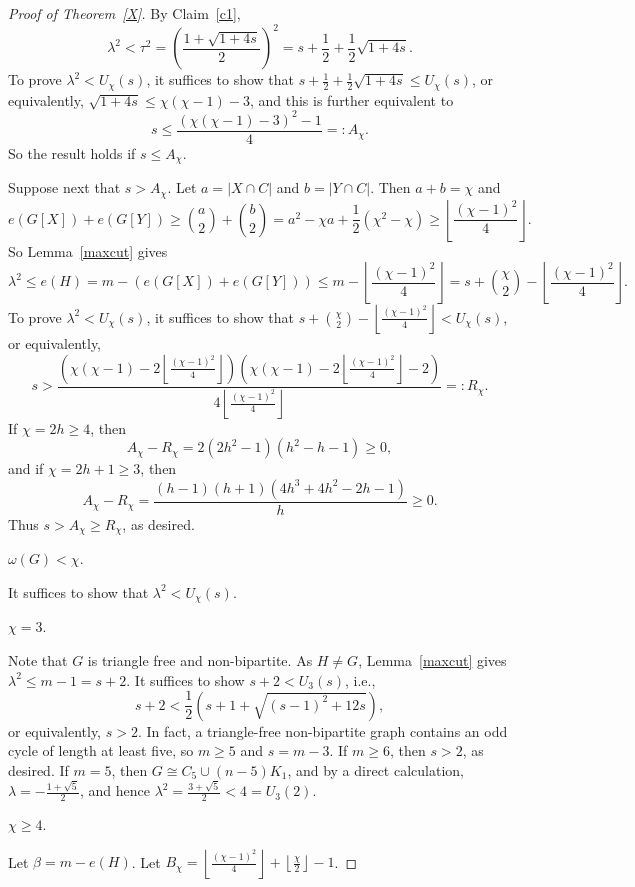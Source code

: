 \documentclass[12pt]{article}
\begin{document}
\begin{proof}[Proof of Theorem~\ref{X}]
By Claim~\ref{c1},
\[
\lambda^2<\tau^2=\left(\frac{1+\sqrt{1+4s}}2\right)^2=s+\frac12+\frac12\sqrt{1+4s}.
\]
To prove $\lambda^2<U_\chi(s)$, it suffices to show that $s+\frac12+\frac12\sqrt{1+4s}\le U_\chi(s)$, or equivalently, %
$\sqrt{1+4s}\le \chi(\chi-1)-3$, and this is further equivalent to \[
s\le\frac{(\chi(\chi-1)-3)^2-1}{4}=:A_\chi.
\]
So the result holds if $s\le A_\chi$. 

Suppose next that $s>A_\chi$.
 Let $a=|X\cap C|$ and $b=|Y\cap C|$. Then $a+b=\chi$ and 
\[
e(G[X])+e(G[Y])\ge {a\choose 2}+{b\choose 2}=a^2-\chi a+\frac{1}{2}(\chi^2-\chi)
\ge \left\lfloor\frac{(\chi-1)^2}{4}\right\rfloor.
\]
So 
Lemma~\ref{maxcut} gives
$$\lambda^2\le e(H)=m-(e(G[X])+e(G[Y]))\le m-\left\lfloor\frac{(\chi-1)^2}{4}\right\rfloor=s+\binom{\chi}{2}-\left\lfloor\frac{(\chi-1)^2}{4}\right\rfloor.$$
To prove $\lambda^2 <U_\chi(s)$, it suffices to show that
 $s+\binom{\chi}{2}-\left\lfloor\frac{(\chi-1)^2}{4}\right\rfloor< U_\chi(s)$, or equivalently, 
\[
s> \frac{\left(\chi(\chi-1)-2\left\lfloor\frac{(\chi-1)^2}{4}\right\rfloor\right)\left(\chi(\chi-1)-2\left\lfloor\frac{(\chi-1)^2}{4}\right\rfloor-2\right)}{4\left\lfloor\frac{(\chi-1)^2}{4}\right\rfloor}=:R_\chi.
\]
 If $\chi=2h\ge4$, then
\[
A_\chi-R_\chi=2(2h^2-1)(h^2-h-1)\ge0,
\]
and if $\chi=2h+1\ge3$, then
\[
A_\chi-R_\chi=
\frac{(h-1)(h+1)(4h^3+4h^2-2h-1)}h\ge0.
\]
Thus  $s>A_\chi\ge  R_\chi$, as desired. 


  $\omega(G)<\chi$. 

It suffices to show that $\lambda^2 <U_\chi(s)$.

  $\chi=3$. 

Note that  $G$ is triangle free and non-bipartite. As $H\ne G$, Lemma~\ref{maxcut} gives $\lambda^2\le m-1=s+2$. It suffices to show  $s+2<U_3(s)$, i.e., 
\[
s+2<\frac{1}{2}\left(s+1+\sqrt{(s-1)^2+12s} \right),
\] 
 or equivalently, $s> 2$. In fact, a triangle-free non-bipartite graph contains an odd cycle of length at least five, so $m\ge5$ and
$s=m-3$. If $m\ge 6$, then $s>2$, as desired. If $m=5$, then 
$G\cong C_5\cup (n-5)K_1$, and by a direct calculation, $\lambda=-\frac{1+\sqrt5}{2}$, and hence
$\lambda^2=\frac{3+\sqrt5}{2}<4=U_3(2)$. 

  $\chi\ge4$. 

Let
$\beta=m-e(H)$. %
Let $B_\chi=\left\lfloor\frac{(\chi-1)^2}{4}\right\rfloor
 +\left\lfloor\frac{\chi}{2}\right\rfloor-1$.


\end{proof}
\end{document}
